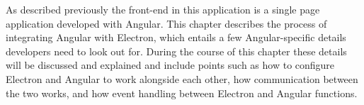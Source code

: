 
As described previously the front-end in this application is a single page application developed with Angular.
This chapter describes the process of integrating Angular with Electron, which entails a few Angular-specific 
details developers need to look out for.
During the course of this chapter these details will be discussed and explained and include points such 
as how to configure Electron and Angular to work alongside each other, how communication between the two works, and 
how event handling between Electron and Angular functions.